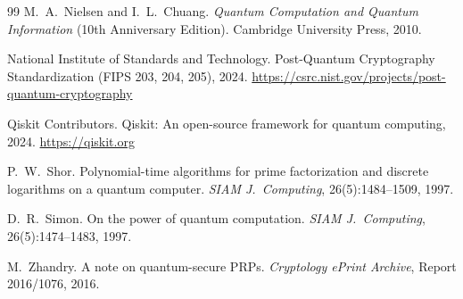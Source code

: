 \documentclass[11pt]{article}
\begin{document}
\begin{thebibliography}{99}
M.~A.~Nielsen and I.~L.~Chuang.
\newblock \emph{Quantum Computation and Quantum Information} (10th Anniversary Edition).
\newblock Cambridge University Press, 2010.

National Institute of Standards and Technology.
\newblock Post-Quantum Cryptography Standardization (FIPS 203, 204, 205), 2024.
\newblock \url{https://csrc.nist.gov/projects/post-quantum-cryptography}

Qiskit Contributors.
\newblock Qiskit: An open-source framework for quantum computing, 2024.
\newblock \url{https://qiskit.org}

P.~W.~Shor.
\newblock Polynomial-time algorithms for prime factorization and discrete logarithms on a quantum computer.
\newblock \emph{SIAM J.\ Computing}, 26(5):1484--1509, 1997.

D.~R.~Simon.
\newblock On the power of quantum computation.
\newblock \emph{SIAM J.\ Computing}, 26(5):1474--1483, 1997.

M.~Zhandry.
\newblock A note on quantum-secure PRPs.
\newblock \emph{Cryptology ePrint Archive}, Report 2016/1076, 2016.

\end{thebibliography}
\end{document}
